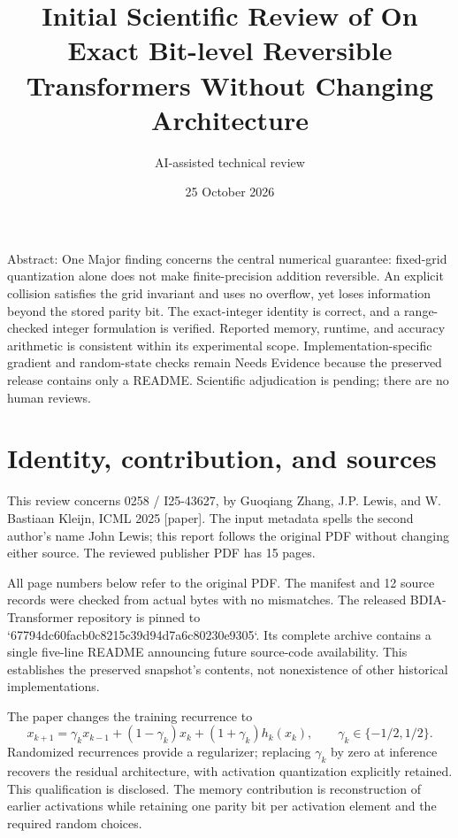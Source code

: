 \documentclass[10pt]{article}
\title{Initial Scientific Review of
On Exact Bit-level Reversible Transformers Without Changing Architecture}
\author{AI-assisted technical review}
\date{25 October 2026}
\begin{document}
\maketitle
Abstract: One Major finding concerns the central numerical guarantee: fixed-grid quantization alone does not make finite-precision addition reversible. An explicit collision satisfies the grid invariant and uses no overflow, yet loses information beyond the stored parity bit. The exact-integer identity is correct, and a range-checked integer formulation is verified. Reported memory, runtime, and accuracy arithmetic is consistent within its experimental scope. Implementation-specific gradient and random-state checks remain Needs Evidence because the preserved release contains only a README. Scientific adjudication is pending; there are no human reviews.\par
\section*{Identity, contribution, and sources}
This review concerns 0258 / I25-43627, by Guoqiang Zhang, J.P. Lewis, and W. Bastiaan Kleijn, ICML 2025 [paper]. The input metadata spells the second author’s name John Lewis; this report follows the original PDF without changing either source. The reviewed publisher PDF has 15 pages.\par
All page numbers below refer to the original PDF. The manifest and 12 source records were checked from actual bytes with no mismatches. The released BDIA-Transformer repository is pinned to `67794dc60facb0c8215c39d94d7a6c80230e9305`. Its complete archive contains a single five-line README announcing future source-code availability. This establishes the preserved snapshot’s contents, not nonexistence of other historical implementations.\par
The paper changes the training recurrence to \[x_{k+1}=\gamma_k x_{k-1}+(1-\gamma_k)x_k+(1+\gamma_k)h_k(x_k),
 \qquad \gamma_k\in\{-1/2,1/2\}.\] Randomized recurrences provide a regularizer; replacing \(\gamma_k\) by zero at inference recovers the residual architecture, with activation quantization explicitly retained. This qualification is disclosed. The memory contribution is reconstruction of earlier activations while retaining one parity bit per activation element and the required random choices.\par
\end{document}

